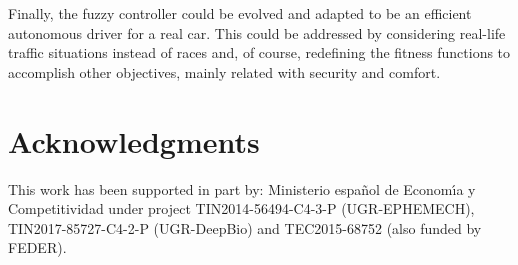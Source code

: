 \documentclass[conference]{IEEEtran}
\begin{document}
Finally, the fuzzy controller could be evolved and adapted to be an efficient autonomous driver for a real car. This could be addressed by considering real-life traffic situations instead of races and, of course, redefining the fitness functions to accomplish other objectives, mainly related with security and comfort.

\section*{Acknowledgments}

This work has been supported in part by: Ministerio espa\~{n}ol de
Econom\'{\i}a y Competitividad under project TIN2014-56494-C4-3-P
(UGR-EPHEMECH), TIN2017-85727-C4-2-P (UGR-DeepBio) and TEC2015-68752 (also funded by FEDER).




\end{document}
